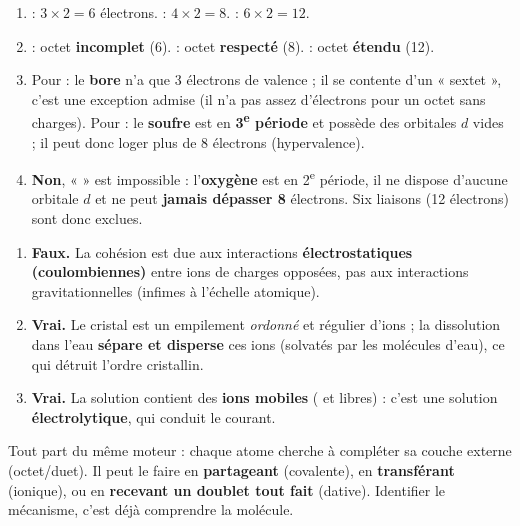 \documentclass[11pt,a4paper]{article}
\begin{document}
\begin{cor}
\begin{enumerate}[label=\alph*),leftmargin=2em,itemsep=2pt]
  \item {} : $3\times 2 = 6$ électrons. \quad {} : $4\times 2 = 8$. \quad
         : $6\times 2 = 12$.
  \item {} : octet \textbf{incomplet} (6).  : octet \textbf{respecté} (8).
         : octet \textbf{étendu} (12).
  \item Pour  : le \textbf{bore} n'a que 3 électrons de valence ; il se contente d'un
        « sextet », c'est une exception admise (il n'a pas assez d'électrons pour un octet sans
        charges). Pour  : le \textbf{soufre} est en \textbf{3\textsuperscript{e} période}
        et possède des orbitales $d$ vides ; il peut donc loger plus de 8 électrons (hypervalence).
  \item \textbf{Non}, «  » est impossible : l'\textbf{oxygène} est en 2\textsuperscript{e}
        période, il ne dispose d'aucune orbitale $d$ et ne peut \textbf{jamais dépasser 8}
        électrons. Six liaisons (12 électrons) sont donc exclues.
\end{enumerate}
\end{cor}

\begin{cor}
\begin{enumerate}[label=\alph*),leftmargin=2em,itemsep=2pt]
  \item \textbf{Faux.} La cohésion est due aux interactions \textbf{électrostatiques
        (coulombiennes)} entre ions de charges opposées, pas aux interactions gravitationnelles
        (infimes à l'échelle atomique).
  \item \textbf{Vrai.} Le cristal est un empilement \emph{ordonné} et régulier d'ions ; la
        dissolution dans l'eau \textbf{sépare et disperse} ces ions (solvatés par les molécules
        d'eau), ce qui détruit l'ordre cristallin.
  \item \textbf{Vrai.} La solution contient des \textbf{ions mobiles} ( et 
        libres) : c'est une solution \textbf{électrolytique}, qui conduit le courant.
\end{enumerate}
\end{cor}

\begin{astucebox}
Tout part du même moteur : chaque atome cherche à compléter sa couche externe (octet/duet).
Il peut le faire en \textbf{partageant} (covalente), en \textbf{transférant} (ionique), ou en
\textbf{recevant un doublet tout fait} (dative). Identifier le mécanisme, c'est déjà comprendre la
molécule.
\end{astucebox}
\end{document}
